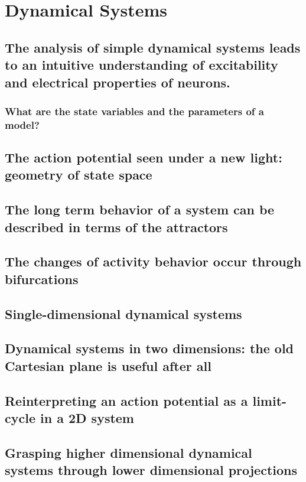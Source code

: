 \chapter{Dynamical Systems}
\label{dyn} %

\section{The analysis of simple dynamical systems leads to an intuitive understanding of excitability and electrical properties of neurons.}
	\subsection{What are the state variables and the parameters of a model?}
	\section{The action potential seen under a new light: geometry of state space}
	\section{The long term behavior of a system can be described in terms of the attractors}
	\section{The changes of activity behavior occur through bifurcations}
	\section{Single-dimensional dynamical systems}
	\section{Dynamical systems in two dimensions: the old Cartesian plane is useful after all}
	\section{Reinterpreting an action potential as a limit-cycle in a 2D system}
	\section{Grasping higher dimensional dynamical systems through lower dimensional projections}
